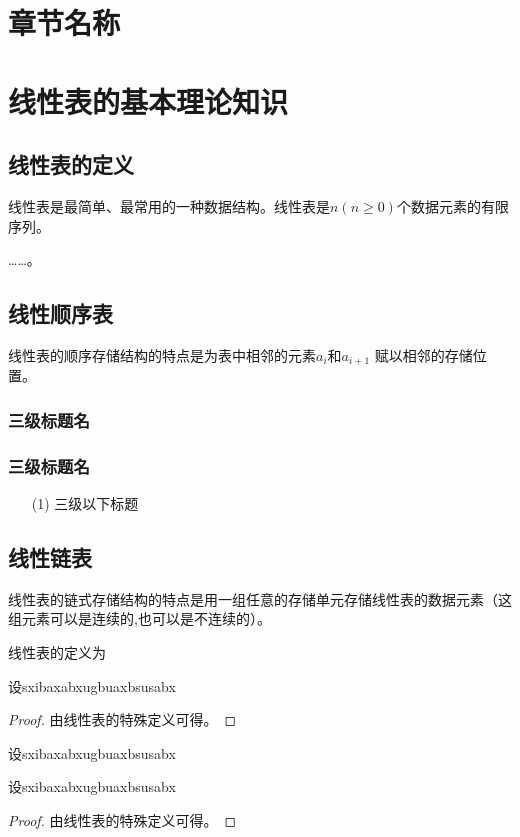 \documentclass[../../main.tex]{subfiles}
\begin{document}
\section{章节名称}



\section{线性表的基本理论知识}
\subsection{线性表的定义}
线性表是最简单、最常用的一种数据结构。线性表\cite{1}是$n (n\ge 0)$个数据元素的有限序列。

……。
\subsection{线性顺序表}
线性表的顺序存储结构的特点是为表中相邻的元素$a_i$和$a_{i+1}$ 赋以相邻的存储位置。
\subsubsection{三级标题名}
\subsubsection{三级标题名}
\begin{itemize}
        \item [(1)] 三级以下标题
\end{itemize}




\subsection{线性链表}

线性表的链式存储结构的特点是用一组任意的存储单元存储线性表的数据元素（这组元素可以是连续的,也可以是不连续的）。


\begin{definition}
线性表的定义为
\end{definition}


\begin{theorem}
设sxibaxabxugbuaxbsusabx
\begin{proof}
由线性表的特殊定义可得。
\end{proof}
\end{theorem}
设sxibaxabxugbuaxbsusabx
\begin{lemma}
设sxibaxabxugbuaxbsusabx
\begin{proof}
由线性表的特殊定义可得。
\end{proof}
\end{lemma}
\end{document}
